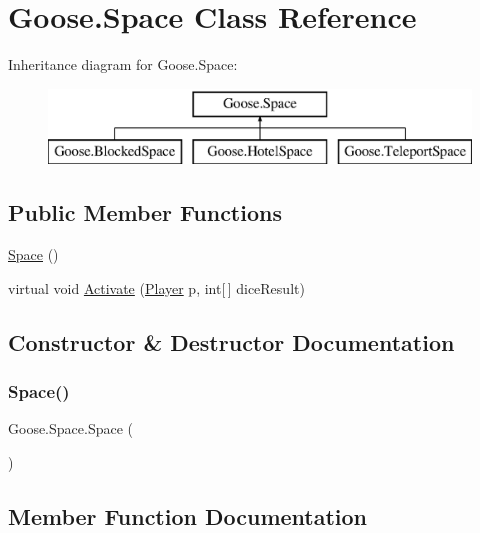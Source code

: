 \hypertarget{class_goose_1_1_space}{}\section{Goose.\+Space Class Reference}
\label{class_goose_1_1_space}
Inheritance diagram for Goose.\+Space\+:\begin{figure}[H]
\begin{center}
\leavevmode
\includegraphics[height=2.000000cm]{class_goose_1_1_space}
\end{center}
\end{figure}
\subsection*{Public Member Functions}
\begin{DoxyCompactItemize}
\item 
\hyperlink{class_goose_1_1_space_ae24471adeabc440a83824138241547cd}{Space} ()
\item 
virtual void \hyperlink{class_goose_1_1_space_a2c04479a1a06c1a35a6b1d8fb9056c49}{Activate} (\hyperlink{class_goose_1_1_player}{Player} p, int\mbox{[}$\,$\mbox{]} dice\+Result)
\end{DoxyCompactItemize}


\subsection{Constructor \& Destructor Documentation}
\mbox{\label{class_goose_1_1_space_ae24471adeabc440a83824138241547cd}} 
\subsubsection{\texorpdfstring{Space()}{Space()}}
{\footnotesize\ttfamily Goose.\+Space.\+Space (\begin{DoxyParamCaption}{ }\end{DoxyParamCaption})}



\subsection{Member Function Documentation}
\mbox{\label{class_goose_1_1_space_a2c04479a1a06c1a35a6b1d8fb9056c49}} 
